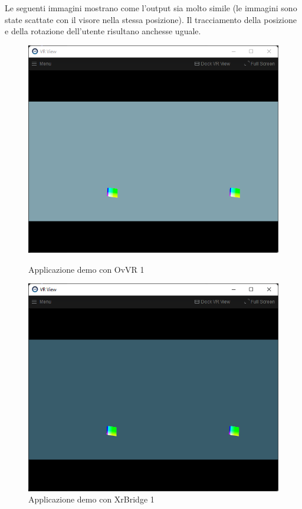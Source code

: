 \documentclass[twoside]{supsistudent}
\begin{document}
Le seguenti immagini mostrano come l'output sia molto simile (le immagini sono state scattate con il visore nella stessa posizione). Il tracciamento della posizione e della rotazione dell'utente risultano anchesse uguale.

\begin{figure}[H]
  \begin{minipage}{.45\textwidth}
    \centering
    \includegraphics[width=.9\linewidth]{resources/demo_ovvr_1.png}
    \caption{Applicazione demo con OvVR 1}
  \end{minipage}
  \begin{minipage}{.45\textwidth}
    \centering
    \includegraphics[width=.9\linewidth]{resources/demo_xrbridge_1.png}
    \caption{Applicazione demo con XrBridge 1}
  \end{minipage}
\end{figure}
\end{document}
